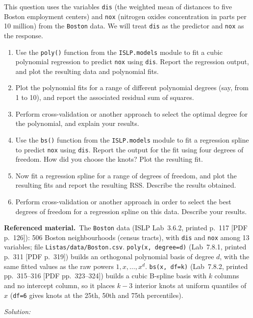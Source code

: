 \documentclass[11pt,a4paper]{article}
\newif\ifsolucoes
\newcommand{\espacoresol}{3.5cm}   %
\numberwithin{equation}{questao}   %
\newenvironment{refmat}{\par\smallskip\noindent\begin{small}\textbf{Referenced material.}\ }{\end{small}\par\smallskip}
\newcommand{\resolespaco}{\ifsolucoes\else\par\textit{Solution:}\vspace{\espacoresol}\par\fi}
\begin{document}
This question uses the variables \texttt{dis} (the weighted mean of distances to five Boston
employment centers) and \texttt{nox} (nitrogen oxides concentration in parts per 10 million) from
the \texttt{Boston} data. We will treat \texttt{dis} as the predictor and \texttt{nox} as the response.
\begin{enumerate}[label=(\alph*)]
\item Use the \texttt{poly()} function from the \texttt{ISLP.models} module to fit a cubic
polynomial regression to predict \texttt{nox} using \texttt{dis}. Report the regression output, and
plot the resulting data and polynomial fits.
\item Plot the polynomial fits for a range of different polynomial degrees (say, from 1 to 10),
and report the associated residual sum of squares.
\item Perform cross-validation or another approach to select the optimal degree for the
polynomial, and explain your results.
\item Use the \texttt{bs()} function from the \texttt{ISLP.models} module to fit a regression
spline to predict \texttt{nox} using \texttt{dis}. Report the output for the fit using four degrees
of freedom. How did you choose the knots? Plot the resulting fit.
\item Now fit a regression spline for a range of degrees of freedom, and plot the resulting fits
and report the resulting RSS. Describe the results obtained.
\item Perform cross-validation or another approach in order to select the best degrees of
freedom for a regression spline on this data. Describe your results.
\end{enumerate}
\begin{refmat}The \texttt{Boston} data (ISLP Lab~3.6.2, printed p.~117 [PDF p.~126]): 506 Boston
neighbourhoods (census tracts), with \texttt{dis} and \texttt{nox} among 13 variables; file
\texttt{Listas/data/Boston.csv}. \texttt{poly(x, degree=d)} (Lab~7.8.1, printed p.~311 [PDF p.~319])
builds an orthogonal polynomial basis of degree $d$, with the same fitted values as the raw powers
$1,x,\dots,x^d$. \texttt{bs(x, df=k)} (Lab~7.8.2, printed pp.~315--316 [PDF pp.~323--324]) builds a
cubic B-spline basis with $k$ columns and no intercept column, so it places $k-3$ interior knots at
uniform quantiles of $x$ (\texttt{df=6} gives knots at the 25th, 50th and 75th percentiles).\end{refmat}
\resolespaco
\end{document}
